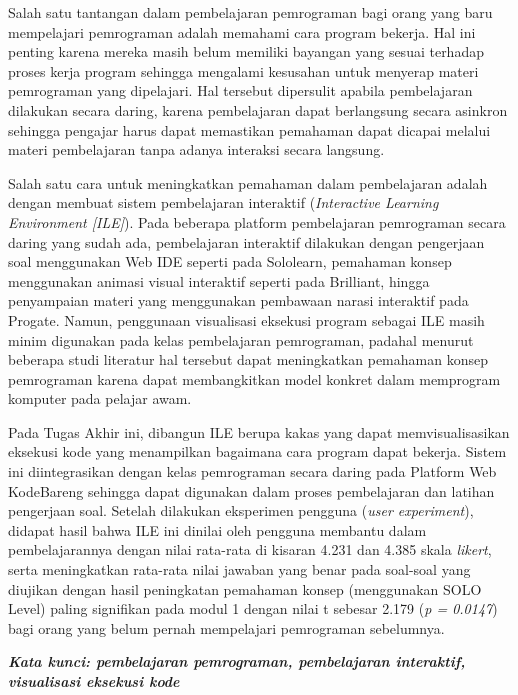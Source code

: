 \begin{singlespace}
  Salah satu tantangan dalam pembelajaran pemrograman bagi orang yang baru mempelajari pemrograman adalah memahami cara program bekerja. Hal ini penting karena mereka masih belum memiliki bayangan yang sesuai terhadap proses kerja program sehingga mengalami kesusahan untuk menyerap materi pemrograman yang dipelajari. Hal tersebut dipersulit apabila pembelajaran dilakukan secara daring, karena pembelajaran dapat berlangsung secara asinkron sehingga pengajar harus dapat memastikan pemahaman dapat dicapai melalui materi pembelajaran tanpa adanya interaksi secara langsung.

  Salah satu cara untuk meningkatkan pemahaman dalam pembelajaran adalah dengan membuat sistem pembelajaran interaktif (\textit{Interactive Learning Environment [ILE]}). Pada beberapa platform pembelajaran pemrograman secara daring yang sudah ada, pembelajaran interaktif dilakukan dengan pengerjaan soal menggunakan Web IDE seperti pada Sololearn, pemahaman konsep menggunakan animasi visual interaktif seperti pada Brilliant, hingga penyampaian materi yang menggunakan pembawaan narasi interaktif pada Progate. Namun, penggunaan visualisasi eksekusi program sebagai ILE masih minim digunakan pada kelas pembelajaran pemrograman, padahal menurut beberapa studi literatur hal tersebut dapat meningkatkan pemahaman konsep pemrograman karena dapat membangkitkan model konkret dalam memprogram komputer pada pelajar awam.

  Pada Tugas Akhir ini, dibangun ILE berupa kakas yang dapat memvisualisasikan eksekusi kode yang menampilkan bagaimana cara program dapat bekerja. Sistem ini diintegrasikan dengan kelas pemrograman secara daring pada Platform Web KodeBareng sehingga dapat digunakan dalam proses pembelajaran dan latihan pengerjaan soal. Setelah dilakukan eksperimen pengguna (\textit{user experiment}), didapat hasil bahwa ILE ini dinilai oleh pengguna membantu dalam pembelajarannya dengan nilai rata-rata di kisaran 4.231 dan 4.385 skala \textit{likert}, serta meningkatkan rata-rata nilai jawaban yang benar pada soal-soal yang diujikan dengan hasil peningkatan pemahaman konsep (menggunakan SOLO Level) paling signifikan pada modul 1 dengan nilai t sebesar 2.179 (\textit{p = 0.0147}) bagi orang yang belum pernah mempelajari pemrograman sebelumnya.

  \textbf{\textit{Kata kunci: pembelajaran pemrograman, pembelajaran interaktif, visualisasi eksekusi kode}}
\end{singlespace}
\clearpage
